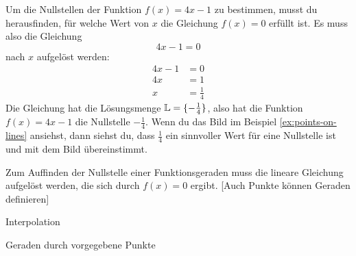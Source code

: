 \documentclass[../../main.tex]{subfiles}
\begin{document}
\begin{example}{}
    Um die Nullstellen der Funktion $f(x)=4x-1$ zu bestimmen, musst du herausfinden, für welche Wert von $x$ die Gleichung $f(x)=0$ erfüllt ist. Es muss also die Gleichung
    \[4x-1=0\]
    nach $x$ aufgelöst werden:
    \begin{align*}
        4x-1&=0\\
        4x&=1\\
        x&=\frac{1}{4}
    \end{align*}
    Die Gleichung hat die Lösungsmenge $\mathbb{L}=\{-\frac{1}{4}\}$, also hat die Funktion \mbox{$f(x)=4x-1$} die Nullstelle $-\frac{1}{4}$. Wenn du das Bild im Beispiel \ref{ex:points-on-lines} ansiehst, dann siehst du, dass $\frac{1}{4}$ ein sinnvoller Wert für eine Nullstelle ist und mit dem Bild übereinstimmt.
\end{example}

Zum Auffinden der Nullstelle einer Funktionsgeraden muss die lineare Gleichung aufgelöst werden, die sich durch $f(x)=0$ ergibt. [Auch Punkte können Geraden definieren]

Interpolation

\begin{nutshell}{Geraden durch vorgegebene Punkte}
\end{nutshell}
\end{document}
